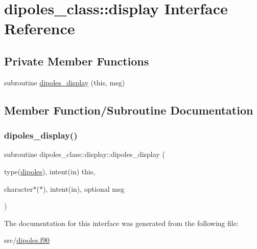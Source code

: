\hypertarget{interfacedipoles__class_1_1display}{}\section{dipoles\+\_\+class\+:\+:display Interface Reference}
\label{interfacedipoles__class_1_1display}
\subsection*{Private Member Functions}
\begin{DoxyCompactItemize}
\item 
subroutine \hyperlink{interfacedipoles__class_1_1display_a3d1f4136682f30287af165a4a28496e6}{dipoles\+\_\+display} (this, msg)
\end{DoxyCompactItemize}


\subsection{Member Function/\+Subroutine Documentation}
\mbox{\label{interfacedipoles__class_1_1display_a3d1f4136682f30287af165a4a28496e6}} 
\subsubsection{\texorpdfstring{dipoles\+\_\+display()}{dipoles\_display()}}
{\footnotesize\ttfamily subroutine dipoles\+\_\+class\+::display\+::dipoles\+\_\+display (\begin{DoxyParamCaption}\item[{type(\hyperlink{structdipoles__class_1_1dipoles}{dipoles}), intent(in)}]{this,  }\item[{character$\ast$($\ast$), intent(in), optional}]{msg }\end{DoxyParamCaption})\hspace{0.3cm}{\ttfamily [private]}}



The documentation for this interface was generated from the following file\+:\begin{DoxyCompactItemize}
\item 
src/\hyperlink{dipoles_8f90}{dipoles.\+f90}\end{DoxyCompactItemize}
